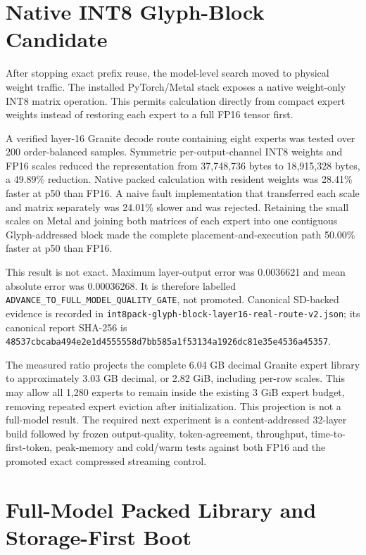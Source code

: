 \section{Native INT8 Glyph-Block Candidate}
\label{sec:native-int8-glyph-block}

After stopping exact prefix reuse, the model-level search moved to physical
weight traffic. The installed PyTorch/Metal stack exposes a native weight-only
INT8 matrix operation. This permits calculation directly from compact expert
weights instead of restoring each expert to a full FP16 tensor first.

A verified layer-16 Granite decode route containing eight experts was tested
over 200 order-balanced samples. Symmetric per-output-channel INT8 weights and
FP16 scales reduced the representation from 37,748,736 bytes to 18,915,328
bytes, a 49.89\% reduction. Native packed calculation with resident weights was
28.41\% faster at p50 than FP16. A naive fault implementation that transferred
each scale and matrix separately was 24.01\% slower and was rejected. Retaining
the small scales on Metal and joining both matrices of each expert into one
contiguous Glyph-addressed block made the complete placement-and-execution path
50.00\% faster at p50 than FP16.

This result is not exact. Maximum layer-output error was 0.0036621 and mean
absolute error was 0.00036268. It is therefore labelled
\texttt{ADVANCE\_TO\_FULL\_MODEL\_QUALITY\_GATE}, not promoted. Canonical SD-backed
evidence is recorded in
\texttt{int8pack-glyph-block-layer16-real-route-v2.json}; its canonical report
SHA-256 is
\texttt{48537cbcaba494e2e1d4555558d7bb585a1f53134a1926dc81e35e4536a45357}.

The measured ratio projects the complete 6.04 GB decimal Granite expert library
to approximately 3.03 GB decimal, or 2.82 GiB, including per-row scales. This
may allow all 1,280 experts to remain inside the existing 3 GiB expert budget,
removing repeated expert eviction after initialization. This projection is not
a full-model result. The required next experiment is a content-addressed
32-layer build followed by frozen output-quality, token-agreement, throughput,
time-to-first-token, peak-memory and cold/warm tests against both FP16 and the
promoted exact compressed streaming control.

\section{Full-Model Packed Library and Storage-First Boot}
\label{sec:int8-storage-first-boot}

